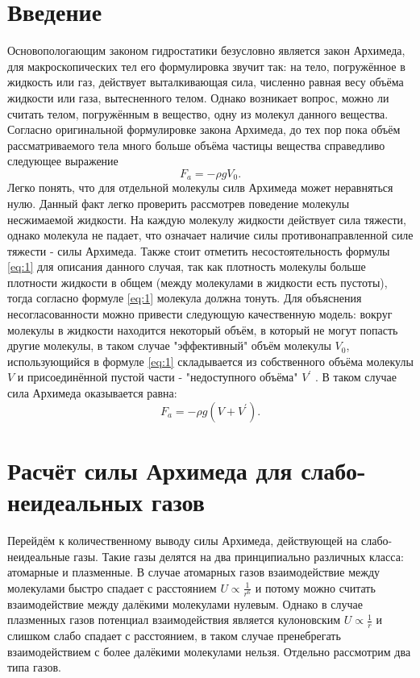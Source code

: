 \documentclass[12pt]{article}
\begin{document}
\section{Введение}
Основопологающим законом гидростатики безусловно является закон Архимеда, для макроскопических тел его 
формулировка звучит так: на тело, погружённое в жидкость или газ, действует выталкивающая сила, 
численно равная весу объёма жидкости или газа, вытесненного телом. Однако возникает вопрос, можно ли считать 
телом, погружённым в вещество, одну из молекул данного вещества. Согласно оригинальной формулировке 
закона Архимеда, до тех пор пока объём рассматриваемого тела много больше объёма частицы вещества справедливо 
следующее выражение
\begin{equation}
    F_{a} = -\rho g V_0. 
    \label{eq:1}
\end{equation}
Легко понять, что для отдельной молекулы силв Архимеда может неравняться нулю. Данный 
факт легко проверить рассмотрев поведение молекулы несжимаемой жидкости. На каждую молекулу 
жидкости действует сила тяжести, однако молекула не падает, что означает наличие силы противонаправленной 
силе тяжести - силы Архимеда. Также стоит отметить несостоятельность формулы \ref{eq:1} для описания данного 
случая, так как плотность молекулы больше плотности жидкости в общем (между молекулами в жидкости есть 
пустоты), тогда согласно формуле \ref{eq:1} молекула должна тонуть.
Для объяснения несогласованности можно привести следующую качественную модель: вокруг молекулы в жидкости 
находится некоторый объём, в который не могут попасть другие молекулы, в таком случае "эффективный" объём 
молекулы $V_0$, использующийся в формуле \ref{eq:1} складывается из собственного объёма молекулы $V$ и присоединённой 
пустой части - "недоступного объёма" $V^{\prime}$ . В таком случае сила Архимеда оказывается равна: 
\begin{equation}
    F_a = -\rho g (V + V^{\prime}).
    \label{eq:2}
\end{equation}

\section{Расчёт силы Архимеда для слабо-неидеальных газов}
Перейдём к количественному выводу силы Архимеда, действующей на слабо-неидеальные газы. Такие газы 
делятся на два принципиально различных класса: атомарные и плазменные. В случае атомарных газов 
взаимодействие между молекулами быстро спадает с расстоянием $U \propto \frac{1}{r^6}$ и потому можно считать 
взаимодействие между далёкими молекулами нулевым. Однако в случае плазменных газов потенциал взаимодействия 
является кулоновским $U \propto \frac{1}{r}$ и слишком слабо спадает с расстоянием, в таком случае пренебрегать 
взаимодействием с более далёкими молекулами нельзя. Отдельно рассмотрим два типа газов. 
\end{document}
